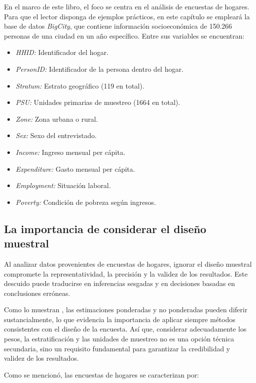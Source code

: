 \documentclass[
  spanish,
  12pt,
]{book}
\providecommand{\tightlist}{%
  \setlength{\itemsep}{0pt}\setlength{\parskip}{0pt}}
\begin{document}
En el marco de este libro, el foco se centra en el análisis de encuestas de hogares. Para que el lector disponga de ejemplos prácticos, en este capítulo se empleará la base de datos \emph{BigCity}, que contiene información socioeconómica de 150.266 personas de una ciudad en un año específico. Entre sus variables se encuentran:

\begin{itemize}
\tightlist
\item
  \emph{HHID:} Identificador del hogar.
\item
  \emph{PersonID:} Identificador de la persona dentro del hogar.
\item
  \emph{Stratum:} Estrato geográfico (119 en total).
\item
  \emph{PSU:} Unidades primarias de muestreo (1664 en total).
\item
  \emph{Zone:} Zona urbana o rural.
\item
  \emph{Sex:} Sexo del entrevistado.
\item
  \emph{Income:} Ingreso mensual per cápita.
\item
  \emph{Expenditure:} Gasto mensual per cápita.
\item
  \emph{Employment:} Situación laboral.
\item
  \emph{Poverty:} Condición de pobreza según ingresos.
\end{itemize}

\subsection{La importancia de considerar el diseño muestral}\label{la-importancia-de-considerar-el-diseuxf1o-muestral}

Al analizar datos provenientes de encuestas de hogares, ignorar el diseño muestral compromete la representatividad, la precisión y la validez de los resultados. Este descuido puede traducirse en inferencias sesgadas y en decisiones basadas en conclusiones erróneas.

Como lo muestran \citet{korn1995analysis}, las estimaciones ponderadas y no ponderadas pueden diferir sustancialmente, lo que evidencia la importancia de aplicar siempre métodos consistentes con el diseño de la encuesta. Así que, considerar adecuadamente los pesos, la estratificación y las unidades de muestreo no es una opción técnica secundaria, sino un requisito fundamental para garantizar la credibilidad y validez de los resultados.

Como se mencionó, las encuestas de hogares se caracterizan por:
\end{document}
